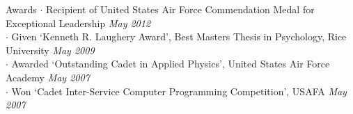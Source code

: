 
\begin{rSection}{Awards}
  $\cdot$ Recipient of United States Air Force Commendation Medal for Exceptional Leadership 
  \hfill {\em May 2012} \\
  $\cdot$ Given `Kenneth R. Laughery Award', Best Masters Thesis in Psychology, Rice University
  \hfill {\em May 2009} \\
  $\cdot$ Awarded `Outstanding Cadet in Applied Physics', United States Air Force Academy
  \hfill {\em May 2007} \\
  $\cdot$ Won `Cadet Inter-Service Computer Programming Competition', USAFA
  \hfill {\em May 2007}
\end{rSection}
